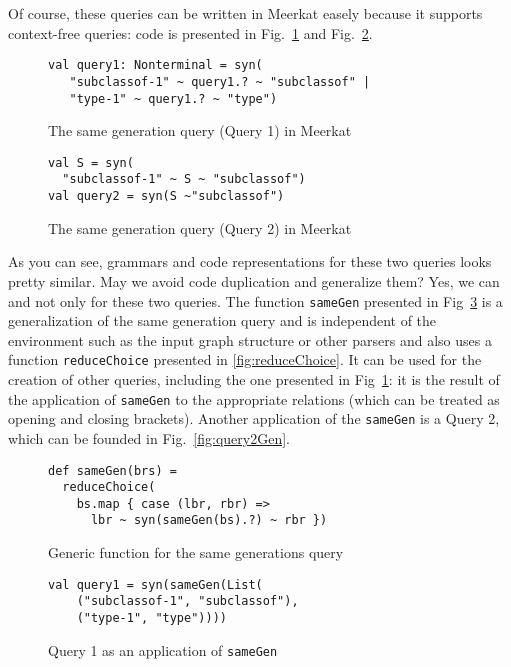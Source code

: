    Of course, these queries can be written in Meerkat easely because it supports context-free queries: code is presented in Fig.~\ref{fig:query1Meerkat} and Fig.~\ref{fig:query2Meerkat}.

\begin{figure}[h]
\begin{lstlisting}
val query1: Nonterminal = syn(
   "subclassof-1" ~ query1.? ~ "subclassof" |
   "type-1" ~ query1.? ~ "type")
\end{lstlisting}
\caption{The same generation query (Query 1) in Meerkat}
\label{fig:query1Meerkat}
\end{figure}


\begin{figure}[h]
\begin{lstlisting}
val S = syn(
  "subclassof-1" ~ S ~ "subclassof")
val query2 = syn(S ~"subclassof")
\end{lstlisting}
\caption{The same generation query (Query 2) in Meerkat}
\label{fig:query2Meerkat}
\end{figure}

As you can see, grammars and code representations for these two queries looks pretty similar.
May we avoid code duplication and generalize them?
Yes, we can and not only for these two queries.
The function \lstinline{sameGen} presented in Fig~\ref{fig:gen} is a generalization of the same generation query and is independent of the environment such as the input graph structure or other parsers and also uses a function \lstinline{reduceChoice} presented in \ref{fig:reduceChoice}.
It can be used for the creation of other queries, including the one presented in Fig~\ref{fig:query1Meerkat}: it is the result of the application of \lstinline{sameGen} to the appropriate relations (which can be treated as opening and closing brackets).
Another application of the \lstinline{sameGen} is a Query 2, which can be founded in Fig.~\ref{fig:query2Gen}.


\begin{figure}[h]
\begin{lstlisting}
def sameGen(brs) =
  reduceChoice(
    bs.map { case (lbr, rbr) =>
      lbr ~ syn(sameGen(bs).?) ~ rbr })
\end{lstlisting}
\caption{Generic function for the same generations query}
\label{fig:gen}
\end{figure}


\begin{figure}[h]
\begin{lstlisting}
val query1 = syn(sameGen(List(
    ("subclassof-1", "subclassof"),
    ("type-1", "type"))))
\end{lstlisting}
\caption{Query 1 as an application of \lstinline{sameGen}}
\label{fig:query1Gen}
\end{figure}


